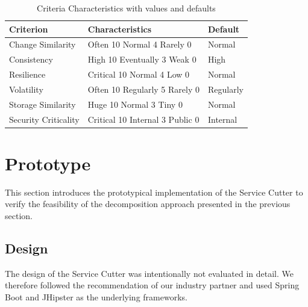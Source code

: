 \begin{table}[H]
	\centering
	\caption{Criteria Characteristics with values and defaults}
	\label{tab:characteristics}
	\begin{tabular}{|p{100pt}|p{80pt}|p{60pt}|}
		\hline	
		\textbf Criterion & Characteristics & Default\\
		\hline
		Change Similarity & Often 10 \newline Normal 4 \newline Rarely 0 & Normal\\
		\hline
		Consistency & High 10 \newline Eventually 3 \newline Weak 0 & High\\
		\hline
		Resilience & Critical 10 \newline Normal 4 \newline Low 0 & Normal\\
		\hline
		Volatility & Often 10 \newline Regularly 5 \newline Rarely 0 & Regularly \\
		\hline
		Storage Similarity & Huge 10 \newline Normal 3 \newline Tiny 0 & Normal\\
		\hline
		Security Criticality & Critical 10 \newline Internal 3 \newline Public 0 & Internal\\
		\hline
	\end{tabular}
\end{table}


\section{Prototype} 

This section introduces the prototypical implementation of the Service Cutter to verify the feasibility of the decomposition approach presented in the previous section.

\subsection{Design}

The design of the Service Cutter was intentionally not evaluated in detail. We therefore followed the recommendation of our industry partner and used Spring Boot\cite{springboot} and JHipster\cite{jhipster} as the underlying frameworks.

